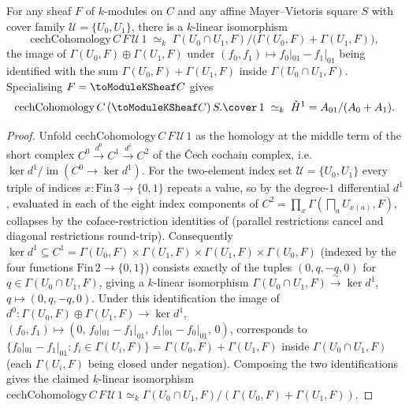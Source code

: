 \begin{proposition}
  \label{thm:adelic_cechH1_eq_cokernel}
  \leanok
  For any sheaf \(F\) of \(k\)-modules on \(C\) and any affine
  Mayer--Vietoris square \(S\) with cover family \(\mathcal U = \{U_0,
  U_1\}\), there is a \(k\)-linear isomorphism
  \[
    \mathrm{cechCohomology}\, C\, F\, \mathcal U\, 1
    \;\simeq_k\; \Gamma(U_0 \cap U_1, F) \big/
      \bigl(\Gamma(U_0, F) + \Gamma(U_1, F)\bigr),
  \]
  the image of \(\Gamma(U_0, F) \oplus \Gamma(U_1, F)\) under
  \((f_0, f_1) \mapsto f_0|_{01} - f_1|_{01}\) being identified with the
  sum \(\Gamma(U_0, F) + \Gamma(U_1, F)\) inside \(\Gamma(U_0 \cap U_1,
  F)\). Specialising \(F = \toModuleKSheaf C\) gives
  \[
    \mathrm{cechCohomology}\, C\, (\toModuleKSheaf C)\, S.\cover\, 1
      \;\simeq_k\; \check{H}^1 = A_{01}/(A_0 + A_1).
  \]
\end{proposition}
\begin{proof}
  \leanok
  Unfold \(\mathrm{cechCohomology}\, C\, F\, \mathcal U\, 1\) as the
  homology at the middle term of the short complex
  \(C^0 \xrightarrow{d^0} C^1 \xrightarrow{d^1} C^2\) of the Čech
  cochain complex, i.e.\ \(\ker d^1 / \operatorname{im}(C^0 \to \ker
  d^1)\). For the two-element index set \(\mathcal U = \{U_0, U_1\}\)
  every triple of indices \(x \colon \mathrm{Fin}\,3 \to \{0,1\}\)
  repeats a value, so by  the
  degree-\(1\) differential \(d^1\), evaluated in each of the eight
  index components of \(C^2 = \prod_x \Gamma(\bigsqcap_a
  U_{x(a)}, F)\), collapses by the coface-restriction identities of
   (parallel restrictions
  cancel and diagonal restrictions round-trip). Consequently
  \(\ker d^1 \subseteq C^1 = \Gamma(U_0, F) \times \Gamma(U_1, F) \times
  \Gamma(U_1, F) \times \Gamma(U_0, F)\) (indexed by the four functions
  \(\mathrm{Fin}\,2 \to \{0,1\}\)) consists exactly of the tuples
  \((0, q, -q, 0)\) for \(q \in \Gamma(U_0 \cap U_1, F)\), giving a
  \(k\)-linear isomorphism \(\Gamma(U_0 \cap U_1, F) \xrightarrow{\ \sim\
  } \ker d^1\), \(q \mapsto (0, q, -q, 0)\). Under this identification
  the image of \(d^0 \colon \Gamma(U_0, F) \oplus \Gamma(U_1, F) \to
  \ker d^1\), \((f_0, f_1) \mapsto (0,\, f_0|_{01} - f_1|_{01},\,
  f_1|_{01} - f_0|_{01},\, 0)\), corresponds to \(\{ f_0|_{01} -
  f_1|_{01} : f_i \in \Gamma(U_i, F)\} = \Gamma(U_0, F) + \Gamma(U_1,
  F)\) inside \(\Gamma(U_0 \cap U_1, F)\) (each \(\Gamma(U_i, F)\) being
  closed under negation). Composing the two identifications gives the
  claimed \(k\)-linear isomorphism
  \(\mathrm{cechCohomology}\, C\, F\, \mathcal U\, 1 \simeq_k
  \Gamma(U_0 \cap U_1, F)/(\Gamma(U_0, F) + \Gamma(U_1, F))\).
\end{proof}

